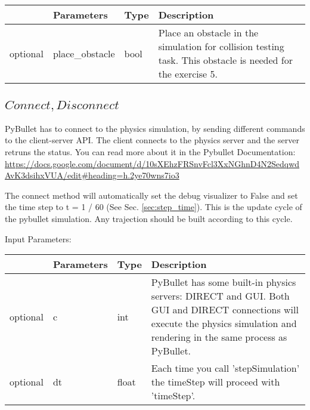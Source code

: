 \documentclass[
	ngerman,
	accentcolor=9c,%
	type=intern,
	marginpar=false
	]{tudapub}
\begin{document}
\begin{tabular}{|p{}|p{}|p{}| p{}|}
\hline
 & \textbf{Parameters} & \textbf{Type} & \textbf{Description} \\
\hline
optional & place\_obstacle & bool & Place an obstacle in the simulation for collision testing task. This obstacle is needed for the exercise 5.   \\
\hline
\end{tabular}



\vspace{0.5cm}

\subsection{$Connect, Disconnect$}
\label{sec:connect}
PyBullet has to connect to the physics simulation, by sending different commands to the client-server API. The client connects to the physics server and the server retruns the status.  You can read more about it in the Pybullet Documentation: \url{https://docs.google.com/document/d/10sXEhzFRSnvFcl3XxNGhnD4N2SedqwdAvK3dsihxVUA/edit#heading=h.2ye70wns7io3}

\vspace{0.5cm}

\noindent The connect method will automatically set the debug visualizer to False and set the time step to  t = 1 / 60 (See Sec. \ref{sec:step_time}). This is the update cycle of the pybullet simulation. Any trajection should be built according to this cycle. 


\vspace{0.5cm}
\noindent Input Parameters:
\vspace{0.5cm}


\begin{tabular}{|p{}|p{}|p{}| p{}|}
\hline
 & \textbf{Parameters} & \textbf{Type} & \textbf{Description} \\
\hline
optional & c & int &  PyBullet has some built-in physics servers: DIRECT and GUI. Both GUI and DIRECT connections will execute the physics simulation and rendering in the same process as PyBullet.
  \\
\hline
optional & dt & float &  Each time you call 'stepSimulation' the timeStep will proceed with 'timeStep'.  \\
\hline
\end{tabular}
\end{document}
